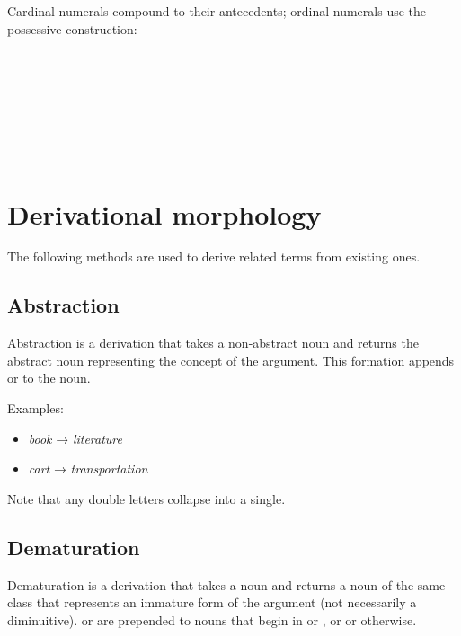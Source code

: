 \documentclass{book}
\begin{document}
Cardinal numerals compound to their antecedents; ordinal numerals use the possessive  construction: \\
~\\
 \\
 \\
  \\
~\\
 \\
   \\
 

\chapter{Derivational morphology}

The following methods are used to derive related terms from existing ones.

\section{Abstraction}

Abstraction is a derivation that takes a non-abstract noun and returns the abstract noun representing the concept of the argument. This formation appends  or  to the noun.

Examples:

\begin{itemize}
    \item {} \emph{book} →  \emph{literature}
    \item {} \emph{cart} →  \emph{transportation}
\end{itemize}

Note that any double letters collapse into a single.

\section{Dematuration}

Dematuration is a derivation that takes a noun and returns a noun of the same class that represents an immature form of the argument (not necessarily a diminuitive).  or  are prepended to nouns that begin in  or , or  or  otherwise.
\end{document}
